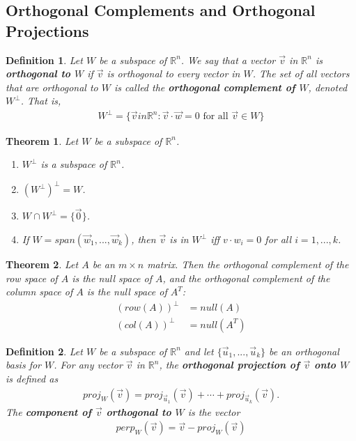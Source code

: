 \documentclass{article}
\theoremstyle{sltheorem}
\newtheorem{definition}{Definition}[section]
\newtheorem{theorem}{Theorem}[section]
\begin{document}
\subsection{Orthogonal Complements and Orthogonal Projections}
\begin{definition}
    Let $W$ be a subspace of $\mathbb{R}^n$. We say that a vector $\vec v$ in $\mathbb{R}^n$ is \textbf{orthogonal to $W$} if $\vec v$ is orthogonal to every vector in $W$. The set of all vectors that are orthogonal to $W$ is called the \textbf{orthogonal complement of $W$}, denoted $W^{\perp}$. That is,
    \begin{align*}
        W^{\perp} = \{\vec v in \mathbb{R}^n:\vec v \cdot \vec w = 0 \text{ for all }\vec v\in W\}
    \end{align*}
\end{definition}
\begin{theorem}
    Let $W$ be a subspace of $\mathbb{R}^n$.
    \begin{enumerate}
        \item $W^{\perp}$ is a subspace of $\mathbb{R}^n$.
        \item $\left(W^{\perp}\right)^{\perp}=W$.
        \item $W\cap W^{\perp}=\{\vec 0\}$.
        \item If $W=span({\vec w_1, ..., \vec w_k})$, then $\vec v$ is in $W^{\perp}$ iff $v\cdot w_i=0$ for all $i=1,...,k$.
    \end{enumerate}
\end{theorem}
\begin{theorem}
    Let $A$ be an $m\times n$ matrix. Then the orthogonal complement of the row space of $A$ is the null space of $A$, and the orthogonal complement of the column space of $A$ is the null space of $A^T$:
    \begin{align*}
        (row(A))^{\perp}&=null(A)\\
        (col(A))^{\perp}&=null(A^T)
    \end{align*}
\end{theorem}
\begin{definition}
    Let $W$ be a subspace of $\mathbb{R}^n$ and let $\{\vec u_1, ..., \vec u_k\}$ be an orthogonal basis for $W$.
    For any vector $\vec v$ in $\mathbb{R}^n$, the \textbf{orthogonal projection of $\vec v$ onto $W$} is defined as
    \begin{align*}
        proj_W(\vec v)=proj_{\vec u_1}(\vec v) + \cdots + proj_{\vec u_k}(\vec v).
    \end{align*}
    The \textbf{component of $\vec v$ orthogonal to $W$} is the vector
    \begin{align*}
        perp_W(\vec v) = \vec v - proj_W(\vec v)
    \end{align*}
\end{definition}
\end{document}

